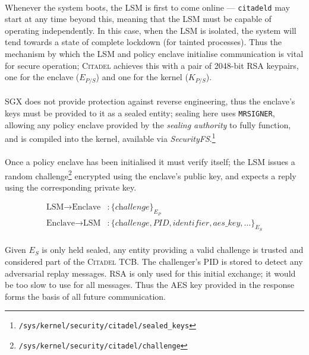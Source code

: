 \paragraph{} Whenever the system boots, the LSM is first to come online --- \texttt{citadeld} may start at any time beyond this, meaning that the LSM must be capable of operating independently. In this case, when the LSM is isolated, the system will tend towards a state of complete lockdown (for tainted processes). Thus the mechanism by which the LSM and policy enclave initialise communication is vital for secure operation; \textsc{Citadel} achieves this with a pair of 2048-bit RSA keypairs, one for the enclave ($E_{P/S}$) and one for the kernel ($K_{P/S}$).

\paragraph{} SGX does not provide protection against reverse engineering, thus the enclave's keys must be provided to it as a sealed entity; sealing here uses \texttt{MRSIGNER}, allowing any policy enclave provided by the \textit{sealing authority} to fully function, and is compiled into the kernel, available via \textit{SecurityFS}.\footnote{\texttt{/sys/kernel/security/citadel/sealed\_keys}}

\paragraph{} Once a policy enclave has been initialised it must verify itself; the LSM issues a random challenge\footnote{\texttt{/sys/kernel/security/citadel/challenge}} encrypted using the enclave's public key, and expects a reply using the corresponding private key.

\vspace{-5mm}
\begin{align*}
    \text{LSM} \rightarrow \text{Enclave} &: \{\textit{challenge}\}_{E_{P}} \\
    \text{Enclave} \rightarrow \text{LSM} &: \{\textit{challenge}, \textit{PID}, \textit{identifier}, \textit{aes\_key}, ...\}_{E_{S}}
\end{align*}

\paragraph{} Given $E_S$ is only held sealed, any entity providing a valid challenge is trusted and considered part of the \textsc{Citadel} TCB. The challenger's PID is stored to detect any adversarial replay messages. RSA is only used for this initial exchange; it would be too slow to use for all messages. Thus the AES key provided in the response forms the basis of all future communication.

